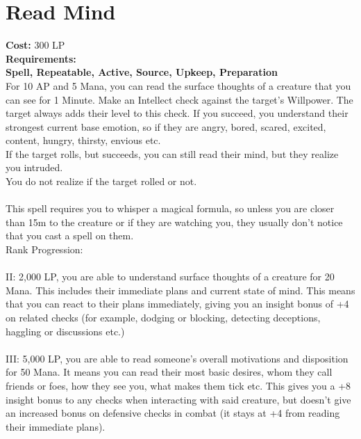 \section{Read Mind}\label{spell:readMind}
\textbf{Cost:} 300 LP\\
\textbf{Requirements:}\\
\textbf{Spell, Repeatable, Active, Source, Upkeep, Preparation}\\
For 10 AP and 5 Mana, you can read the surface thoughts of a creature that you can see for 1 Minute.
Make an Intellect check against the target's Willpower.
The target always adds their level to this check.
If you succeed, you understand their strongest current base emotion, so if they are angry, bored, scared, excited, content, hungry, thirsty, envious etc.\\
If the target rolls, but succeeds, you can still read their mind, but they realize you intruded.\\
You do not realize if the target rolled or not.\\
\\
This spell requires you to whisper a magical formula, so unless you are closer than 15m to the creature or if they are watching you, they usually don't notice that you cast a spell on them.
\\
Rank Progression:\\
\\
II: 2,000 LP, you are able to understand surface thoughts of a creature for 20 Mana.
This includes their immediate plans and current state of mind.
This means that you can react to their plans immediately, giving you an insight bonus of +4 on related checks (for example, dodging or blocking, detecting deceptions, haggling or discussions etc.)\\
\\
III: 5,000 LP, you are able to read someone's overall motivations and disposition for 50 Mana.
It means you can read their most basic desires, whom they call friends or foes, how they see you, what makes them tick etc.
This gives you a +8 insight bonus to any checks when interacting with said creature, but doesn't give an increased bonus on defensive checks in combat (it stays at +4 from reading their immediate plans).\\